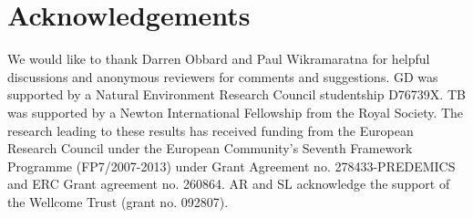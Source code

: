 \documentclass[11pt,oneside,letterpaper]{article}
\begin{document}
\section*{Acknowledgements}
We would like to thank Darren Obbard and Paul Wikramaratna for helpful discussions and anonymous reviewers for comments and suggestions.
GD was supported by a Natural Environment Research Council studentship D76739X.
TB was supported by a Newton International Fellowship from the Royal Society. 
The research leading to these results has received funding from the European Research Council under the European Community's Seventh Framework Programme (FP7/2007-2013) under Grant Agreement no. 278433-PREDEMICS and ERC Grant agreement no. 260864.
AR and SL acknowledge the support of the Wellcome Trust (grant no. 092807).



\end{document}
